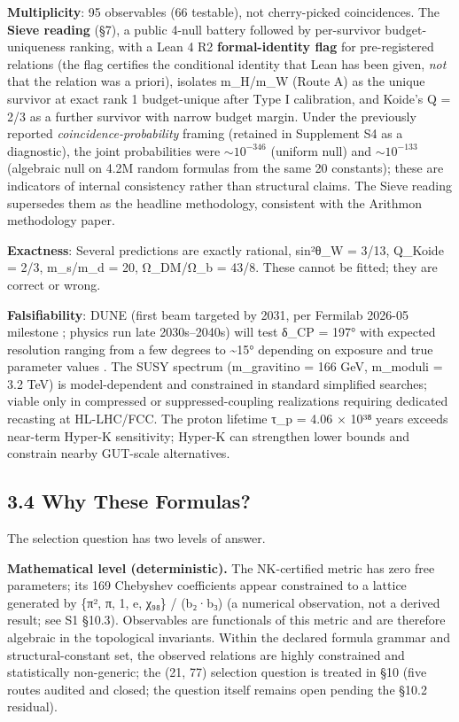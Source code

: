 \documentclass[11pt,a4paper]{article}
\begin{document}
\textbf{Multiplicity}: 95 observables (66 testable), not cherry-picked coincidences. The \textbf{Sieve reading} (§7), a public 4-null battery followed by per-survivor budget-uniqueness ranking, with a Lean 4 R2 \textbf{formal-identity flag} for pre-registered relations (the flag certifies the conditional identity that Lean has been given, \emph{not} that the relation was a priori), isolates m\_\allowbreak{}H/m\_\allowbreak{}W (Route A) as the unique survivor at exact rank 1 budget-unique after Type I calibration, and Koide's Q = 2/3 as a further survivor with narrow budget margin. Under the previously reported \emph{coincidence-probability} framing (retained in Supplement S4 as a diagnostic), the joint probabilities were \(\sim 10^{-346}\) (uniform null) and \(\sim 10^{-133}\) (algebraic null on 4.2M random formulas from the same 20 constants); these are indicators of internal consistency rather than structural claims. The Sieve reading supersedes them as the headline methodology, consistent with the Arithmon methodology paper.

\textbf{Exactness}: Several predictions are exactly rational, sin²θ\_\allowbreak{}W = 3/13, Q\_\allowbreak{}Koide = 2/3, m\_\allowbreak{}s/m\_\allowbreak{}d = 20, Ω\_\allowbreak{}DM/Ω\_\allowbreak{}b = 43/8. These cannot be fitted; they are correct or wrong.

\textbf{Falsifiability}: DUNE (first beam targeted by 2031, per Fermilab 2026-05 milestone \cite{47}; physics run late 2030s--2040s) will test δ\_\allowbreak{}CP = 197° with expected resolution ranging from a few degrees to \textasciitilde15° depending on exposure and true parameter values \cite{30,31}. The SUSY spectrum (m\_\allowbreak{}gravitino = 166 GeV, m\_\allowbreak{}moduli = 3.2 TeV) is model-dependent and constrained in standard simplified searches; viable only in compressed or suppressed-coupling realizations requiring dedicated recasting at HL-LHC/FCC. The proton lifetime τ\_\allowbreak{}p = 4.06 × 10³⁸ years exceeds near-term Hyper-K sensitivity; Hyper-K can strengthen lower bounds and constrain nearby GUT-scale alternatives.

\subsection{3.4 Why These Formulas?}\label{why-these-formulas}

The selection question has two levels of answer.

\textbf{Mathematical level (deterministic).} The NK-certified metric has zero free parameters; its 169 Chebyshev coefficients appear constrained to a lattice generated by \{π², π, 1, e, χ₉₈\} / (b₂·b₃) (a numerical observation, not a derived result; see S1 §10.3). Observables are functionals of this metric and are therefore algebraic in the topological invariants. Within the declared formula grammar and structural-constant set, the observed relations are highly constrained and statistically non-generic; the (21, 77) selection question is treated in §10 (five routes audited and closed; the question itself remains open pending the §10.2 residual).
\end{document}
